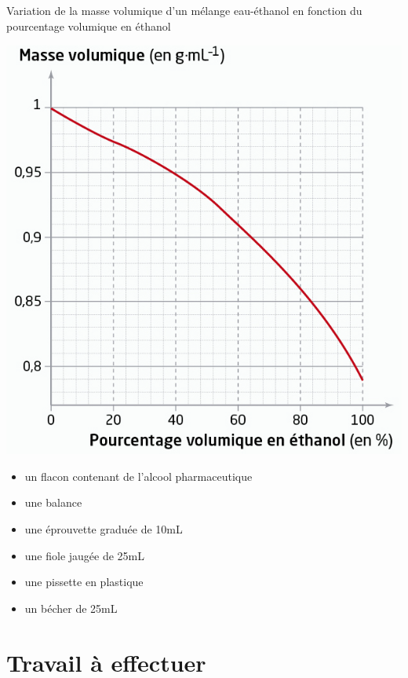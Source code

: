 \begin{multicols}{2}
\begin{doc}{Variation de la masse volumique d’un mélange eau-éthanol en fonction du pourcentage volumique en éthanol}
\begin{center}
    \includegraphics[scale=0.75]{Images/Masse_vol_ethanol.png}
\end{center}
\end{doc}

\end{multicols}

\newpage

\begin{mdframed}[style=autreexo]
\textbf{}
\begin{itemize}
    \item un flacon contenant de l'alcool pharmaceutique
    \item une balance
    \item une éprouvette graduée de 10mL
    \item une fiole jaugée de 25mL
    \item une pissette en plastique
    \item un bécher de 25mL 
\end{itemize}
\end{mdframed}


\section{Travail à effectuer}


